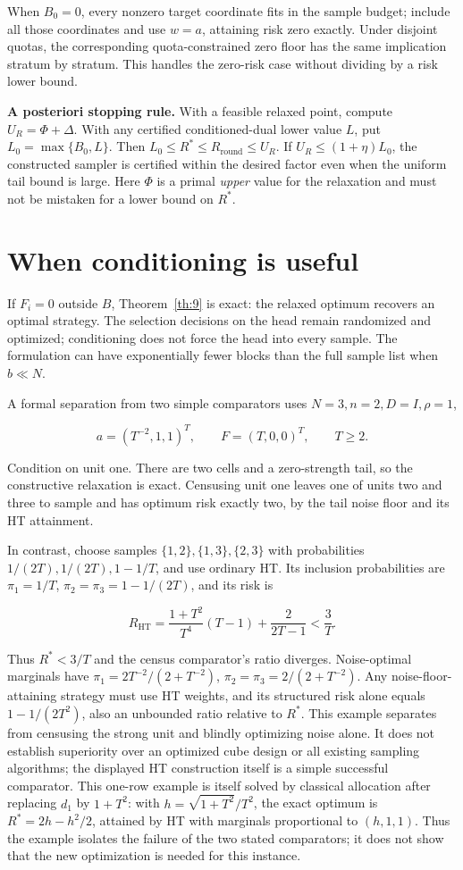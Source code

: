 \documentclass[11pt]{article}
\begin{document}
When \(B_0=0\), every nonzero target coordinate fits in the sample
budget; include all those coordinates and use \(w=a\), attaining risk
zero exactly. Under disjoint quotas, the corresponding quota-constrained
zero floor has the same implication stratum by stratum. This handles the
zero-risk case without dividing by a risk lower bound.

\textbf{A posteriori stopping rule.} With a feasible relaxed point,
compute \(U_R=\Phi+\Delta\). With any certified conditioned-dual lower
value \(L\), put \(L_0=\max\{B_0,L\}\). Then
\(L_0\le R^*\le R_{\mathrm{round}}\le U_R\). If \(U_R\le(1+\eta)L_0\),
the constructed sampler is certified within the desired factor even when
the uniform tail bound is large. Here \(\Phi\) is a primal \emph{upper}
value for the relaxation and must not be mistaken for a lower bound on
\(R^*\).

\section{When conditioning is
useful}\label{when-conditioning-is-useful}

If \(F_i=0\) outside \(B\), Theorem~\ref{th:9} is exact:
the relaxed optimum recovers an optimal strategy. The selection
decisions on the head remain randomized and optimized; conditioning does
not force the head into every sample. The formulation can have
exponentially fewer blocks than the full sample list when \(b\ll N\).

A formal separation from two simple comparators uses
\(N=3,n=2,D=I,\rho=1\),

\[
a=(T^{-2},1,1)^T,\qquad F=(T,0,0)^T,\qquad T\ge2.
\]

Condition on unit one. There are two cells and a zero-strength tail, so
the constructive relaxation is exact. Censusing unit one leaves one of
units two and three to sample and has optimum risk exactly two, by the
tail noise floor and its HT attainment.

In contrast, choose samples \(\{1,2\},\{1,3\},\{2,3\}\) with
probabilities \(1/(2T),1/(2T),1-1/T\), and use ordinary HT. Its
inclusion probabilities are \(\pi_1=1/T\), \(\pi_2=\pi_3=1-1/(2T)\), and
its risk is

\[
R_{\mathrm{HT}}=\frac{1+T^2}{T^4}(T-1)+\frac{2}{2T-1}<\frac3T.
\]

Thus \(R^*<3/T\) and the census comparator's ratio diverges.
Noise-optimal marginals have \(\pi_1=2T^{-2}/(2+T^{-2})\),
\(\pi_2=\pi_3=2/(2+T^{-2})\). Any noise-floor-attaining strategy must
use HT weights, and its structured risk alone equals \(1-1/(2T^2)\),
also an unbounded ratio relative to \(R^*\). This example separates from
censusing the strong unit and blindly optimizing noise alone. It does
not establish superiority over an optimized cube design or all existing
sampling algorithms; the displayed HT construction itself is a simple
successful comparator. This one-row example is itself solved by
classical allocation after replacing \(d_1\) by \(1+T^2\): with
\(h=\sqrt{1+T^2}/T^2\), the exact optimum is \(R^*=2h-h^2/2\), attained
by HT with marginals proportional to \((h,1,1)\). Thus the example
isolates the failure of the two stated comparators; it does not show
that the new optimization is needed for this instance.
\end{document}
